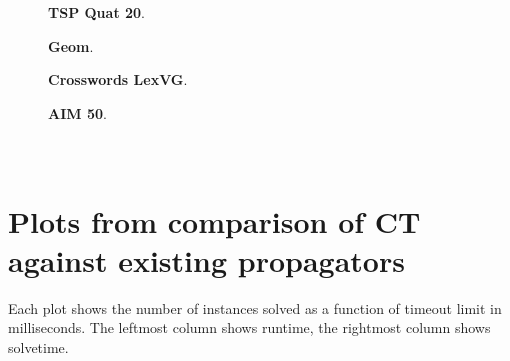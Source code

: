 \documentclass[a4paper,11pt]{article}
\numberwithin{equation}{section}
\begin{document}
\begin{figure}
  \begin{minipage}[b][8cm][s]{0.45\textwidth}
    \centering
    \vfill
    \begin{tikzpicture}[scale=0.8]
      
    \end{tikzpicture}
    \vfill
    \caption{\textbf{TSP Quat 20}.}
    \vspace{\baselineskip}
  \end{minipage}\qquad
  \begin{minipage}[b][8cm][s]{0.45\textwidth}
    \centering
    \vfill
    \begin{tikzpicture}[scale=0.8]
      
    \end{tikzpicture}
    \vfill
    \caption{\textbf{Geom}.}
    \vspace{\baselineskip}
  \end{minipage}\qquad
  \begin{minipage}[b][8cm][s]{0.45\textwidth}
    \centering
    \vfill
    \begin{tikzpicture}[scale=0.8]
      
    \end{tikzpicture}
    \vfill
    \caption{\textbf{Crosswords LexVG}.}
    \vspace{\baselineskip}
  \end{minipage} \qquad
    \begin{minipage}[b][8cm][s]{0.45\textwidth}
    \centering
    \vfill
    \begin{tikzpicture}[scale=0.8]
      
    \end{tikzpicture}
    \vfill
    \caption{\textbf{AIM 50}.}
    \vspace{\baselineskip}
  \end{minipage} \qquad
  
\end{figure}

\clearpage

\section{\\Plots from comparison of CT against existing propagators}
\label{app:compare-gecode}

Each plot shows the number of instances solved as a function
of timeout limit in milliseconds. The leftmost column shows 
runtime,
the rightmost column shows solvetime.


\end{document}
